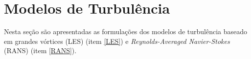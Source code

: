 \section{Modelos de Turbulência} \label{MdT}

Nesta seção são apresentadas as formulações dos modelos de turbulência baseado em grandes vórtices (LES) (item \ref{LES}) e \textit{Reynolds-Averaged Navier-Stokes} (RANS) (item \ref{RANS}).

%


%